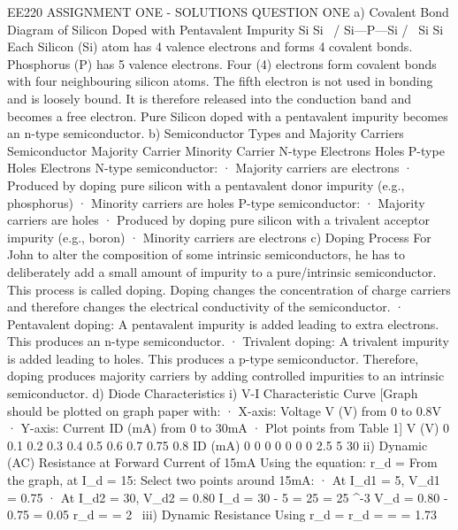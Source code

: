 EE220 ASSIGNMENT ONE - SOLUTIONS
QUESTION ONE
a) Covalent Bond Diagram of Silicon Doped with Pentavalent Impurity
    Si     Si
     \     /
      Si—P—Si
     /     \
    Si     Si
Each Silicon (Si) atom has 4 valence electrons and forms 4 covalent bonds. 
Phosphorus (P) has 5 valence electrons. Four (4) electrons form covalent bonds with four neighbouring silicon atoms.
The fifth electron is not used in bonding and is loosely bound. 
It is therefore released into the conduction band and becomes a free electron.
Pure Silicon doped with a pentavalent impurity becomes an n-type semiconductor.
b) Semiconductor Types and Majority Carriers
Semiconductor Majority Carrier Minority Carrier N-type Electrons Holes P-type Holes Electrons
N-type semiconductor:
· Majority carriers are electrons ·
Produced by doping pure silicon with a pentavalent donor impurity (e.g., phosphorus) · Minority carriers are holes
P-type semiconductor:
· Majority carriers are holes · 
Produced by doping pure silicon with a trivalent acceptor impurity (e.g., boron) · Minority carriers are electrons
c) Doping Process
For John to alter the composition of some intrinsic semiconductors,
he has to deliberately add a small amount of impurity to a pure/intrinsic semiconductor. This process is called doping.
Doping changes the concentration of charge carriers and therefore changes the electrical conductivity of the semiconductor.
· Pentavalent doping: A pentavalent impurity is added leading to extra electrons. This produces an n-type semiconductor. ·
Trivalent doping: A trivalent impurity is added leading to holes. This produces a p-type semiconductor.
Therefore, doping produces majority carriers by adding controlled impurities to an intrinsic semiconductor.
d) Diode Characteristics
i) V-I Characteristic Curve
[Graph should be plotted on graph paper with:
· X-axis: Voltage V (V) from 0 to 0.8V · Y-axis: Current ID (mA) from 0 to 30mA · Plot points from Table 1]
V (V) 0 0.1 0.2 0.3 0.4 0.5 0.6 0.7 0.75 0.8 ID (mA) 0 0 0 0 0 0 0 2.5 5 30
ii) Dynamic (AC) Resistance at Forward Current of 15mA
Using the equation: r_d = 
From the graph, at I_d = 15:
Select two points around 15mA:
· At I_{d1} = 5, V_{d1} = 0.75 · At I_{d2} = 30, V_{d2} = 0.80
\Delta I_d = 30 - 5 = 25\text{ mA} = 25 \times 10^{-3}\text{ A} \Delta V_d = 0.80 - 0.75 = 0.05
r_d = \frac{0.05}{25 \times 10^{-3}} = 2\ \Omega
iii) Dynamic Resistance Using r_d = 
r_d =  =  = 1.73\ \Omega
